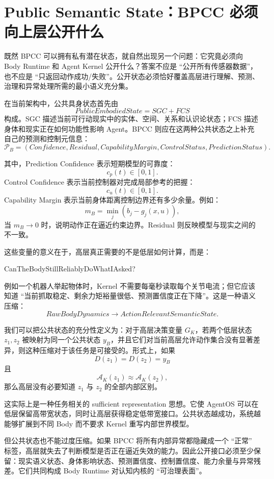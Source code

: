 \section{Public Semantic State：BPCC 必须向上层公开什么}

既然 BPCC 可以拥有私有潜在状态，就自然出现另一个问题：它究竟必须向 Body Runtime 和 Agent Kernel 公开什么？答案不应是 ``公开所有传感器数据''，也不应是 ``只返回动作成功/失败''。公开状态必须恰好覆盖高层进行理解、预测、治理和异常处理所需的最小语义充分集。

在当前架构中，公共具身状态首先由
\[
\boxed{
PublicEmbodiedState
=
SGC+FCS
}
\]
构成。SGC 描述当前可行动现实中的实体、空间、关系和认识论状态；FCS 描述身体和现实正在如何功能性影响 Agent。BPCC 则应在这两种公共状态之上补充自己的预测和控制元信息：
\[
\mathcal P_B
=
(
Confidence,
Residual,
CapabilityMargin,
ControlStatus,
PredictionStatus
).
\]

其中，Prediction Confidence 表示短期模型的可靠度：
\[
c_p(t)\in[0,1].
\]
Control Confidence 表示当前控制器对完成局部参考的把握：
\[
c_u(t)\in[0,1].
\]
Capability Margin 表示当前身体距离控制边界还有多少余量。例如：
\[
m_B
=
\min_j
\left(
b_j-g_j(x,u)
\right),
\]
当 $m_B\rightarrow0$ 时，说明动作正在逼近约束边界。Residual 则反映模型与现实之间的不一致。

这些变量的意义在于，高层真正需要的不是低层如何计算，而是：
\begin{statementbox}
CanTheBodyStillReliablyDoWhatIAsked?
\end{statementbox}
例如一个机器人举起物体时，Kernel 不需要每毫秒读取每个关节电流；但它应该知道 ``当前抓取稳定、剩余力矩裕量很低、预测置信度正在下降''。这是一种语义压缩：
\[
RawBodyDynamics
\rightarrow
ActionRelevantSemanticState.
\]

我们可以把公共状态的充分性定义为：对于高层决策变量 $G_K$，若两个低层状态 $z_1,z_2$ 被映射为同一个公共状态 $y_B$，并且它们对当前高层允许动作集合没有显著差异，则这种压缩对于该任务是可接受的。形式上，如果
\[
D(z_1)=D(z_2)=y_B
\]
且
\[
\mathcal A_K(z_1)
\approx
\mathcal A_K(z_2),
\]
那么高层没有必要知道 $z_1$ 与 $z_2$ 的全部内部区别。

这实际上是一种任务相关的 sufficient representation 思想。它使 AgentOS 可以在低层保留高带宽状态，同时让高层获得稳定低带宽接口。公共状态越成功，系统越能够扩展到不同 Body 而不要求 Kernel 重写内部世界模型。

但公共状态也不能过度压缩。如果 BPCC 将所有内部异常都隐藏成一个 ``正常'' 标签，高层就失去了判断模型是否正在逼近失效的能力。因此公开接口必须至少保留：现实语义状态、身体影响状态、预测置信度、控制置信度、能力余量与异常残差。它们共同构成 Body Runtime 对认知内核的 ``可治理表面''。

